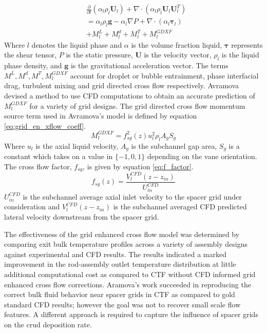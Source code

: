     	\begin{align}
    	& \frac{\partial }{\partial t}(\alpha_l \rho_l \mathbf U_l)
    	+ \nabla \cdot (\alpha_l \rho_l \mathbf U_l \mathbf U_l^T) \nonumber \\
    	&= \alpha_l \rho_l \mathbf{g} - \alpha_l \nabla P + 
    	\nabla \cdot (\alpha_l \bm{\tau}_l) \nonumber \\
    	&+ M^L_l + M^d_l + M^T_l + M_l^{GDXF}
        \label{eq:ctf_lat_mom}
    	\end{align}
Where $l$ denotes the liquid phase and $\alpha$ is the volume fraction liquid, $\bm \tau$ represents the shear tensor, $P$ is the static pressure, $\mathbf U$ is the velocity vector, $\rho_l$ is the liquid phase density, and $\mathbf g$ is the gravitational acceleration vector.  The terms $M^L, M^d, M^T, M_l^{GDXF}$ account for droplet or bubble entrainment, phase interfacial drag, turbulent mixing and grid directed cross flow respectively.  Avramova devised a method to use CFD computations to obtain an accurate prediction of $M_l^{GDXF}$ for a variety of grid designs.
The grid directed cross flow momentum source term used in Avramova's model is defined by equation \ref{eq:grid_en_xflow_coeff}.
    	\begin{equation}
    	M_l^{GDXF} = f^2_{sg}(z) u_l^2 \rho_l A_g S_g
        \label{eq:grid_en_xflow_coeff}
    	\end{equation}
        Where $u_l$ is the axial liquid velocity, $A_g$ is the subchannel gap area, $S_g$ is a constant which takes on a value in $\{-1, 0, 1\}$ depending on the vane orientation. The cross flow factor, $f_{sg}$, is given by equation \ref{eq:f_factor}.
    	\begin{equation}
    	f_{sg}(z) = \frac{V^{CFD}_l(z-z_{in})}{U^{CFD}_{in}}
        \label{eq:f_factor}
    	\end{equation}
        $U^{CFD}_{in}$ is the subchannel average axial inlet velocity to the spacer grid under consideration and $V^{CFD}_l(z-z_{in})$ is the subchannel averaged CFD predicted lateral velocity downstream from the spacer grid.

 The effectiveness of the grid enhanced cross flow model was determined by comparing exit bulk temperature profiles across a variety of assembly designs against experimental and CFD results.  The results indicated a marked improvement in the rod-assembly outlet temperature distribution at little additional computational cost as compared to CTF without CFD informed grid enhanced cross flow corrections.    Aramova's work succeeded in reproducing the correct bulk fluid behavior near spacer grids in CTF as compared to gold standard CFD results; however the goal was not to recover small scale flow features.  A different approach is required to capture the influence of spacer grids on the crud deposition rate.
 
